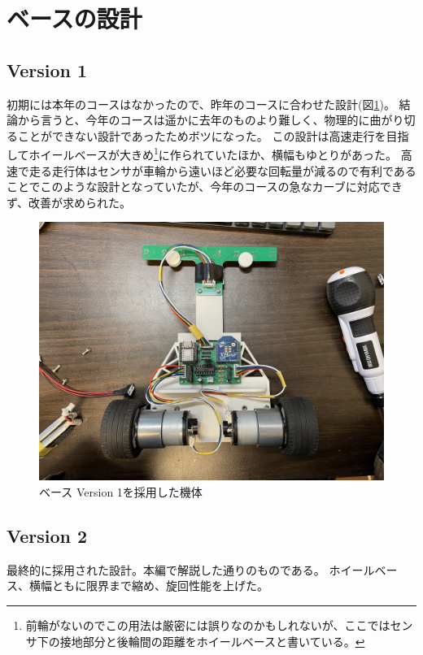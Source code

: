 \documentclass{ltjsreport}
\begin{document}
\section{ベースの設計}
\subsection{Version 1}
初期には本年のコースはなかったので、昨年のコースに合わせた設計(図\ref{fig:v1_machine})。
結論から言うと、今年のコースは遥かに去年のものより難しく、物理的に曲がり切ることができない設計であったためボツになった。
この設計は高速走行を目指してホイールベースが大きめ\footnote{前輪がないのでこの用法は厳密には誤りなのかもしれないが、ここではセンサ下の接地部分と後輪間の距離をホイールベースと書いている。}に作られていたほか、横幅もゆとりがあった。
高速で走る走行体はセンサが車輪から遠いほど必要な回転量が減るので有利であることでこのような設計となっていたが、今年のコースの急なカーブに対応できず、改善が求められた。


\begin{figure}[bth]
  \centering
  \includegraphics[keepaspectratio, scale=0.11]
       {img/ver1_machine.jpg}
  \caption{ベース Version 1を採用した機体}
  \label{fig:v1_machine}
 \end{figure}

\subsection{Version 2}
最終的に採用された設計。本編で解説した通りのものである。
ホイールベース、横幅ともに限界まで縮め、旋回性能を上げた。
\end{document}
